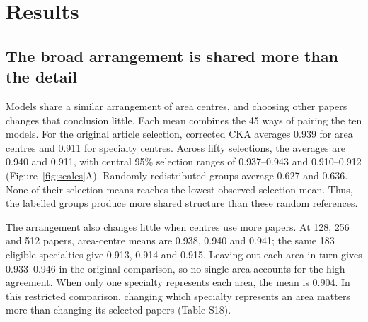 \documentclass[12pt]{article}
\begin{document}
\section{Results}
\FloatBarrier
\subsection{The broad arrangement is shared more than the detail}
Models share a similar arrangement of area centres, and choosing other papers changes that conclusion little. Each mean combines the 45 ways of pairing the ten models. For the original article selection, corrected CKA averages 0.939 for area centres and 0.911 for specialty centres. Across fifty selections, the averages are 0.940 and 0.911, with central 95\% selection ranges of 0.937--0.943 and 0.910--0.912 (Figure~\ref{fig:scales}A). Randomly redistributed groups average 0.627 and 0.636. None of their selection means reaches the lowest observed selection mean. Thus, the labelled groups produce more shared structure than these random references.

The arrangement also changes little when centres use more papers. At 128, 256 and 512 papers, area-centre means are 0.938, 0.940 and 0.941; the same 183 eligible specialties give 0.913, 0.914 and 0.915. Leaving out each area in turn gives 0.933--0.946 in the original comparison, so no single area accounts for the high agreement. When only one specialty represents each area, the mean is 0.904. In this restricted comparison, changing which specialty represents an area matters more than changing its selected papers (Table S18).
\end{document}
